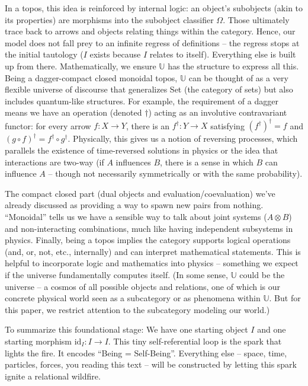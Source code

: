 \documentclass{article}
\begin{document}
In a topos, this idea is reinforced by internal logic: an object’s subobjects (akin to its properties) are morphisms into the subobject classifier $\Omega$. Those ultimately trace back to arrows and objects relating things within the category. Hence, our model does not fall prey to an infinite regress of definitions – the regress stops at the initial tautology ($I$ exists because $I$ relates to itself). Everything else is built up from there. Mathematically, we ensure $\mathbb{U}$ has the structure to express all this. Being a dagger-compact closed monoidal topos, $\mathbb{U}$ can be thought of as a very flexible universe of discourse that generalizes Set (the category of sets) but also includes quantum-like structures. For example, the requirement of a dagger means we have an operation (denoted $\dagger$) acting as an involutive contravariant functor: for every arrow $f: X \to Y$, there is an $f^\dagger: Y \to X$ satisfying $(f^\dagger)^\dagger = f$ and $(g\circ f)^\dagger = f^\dagger \circ g^\dagger$. Physically, this gives us a notion of reversing processes, which parallels the existence of time-reversed solutions in physics or the idea that interactions are two-way (if $A$ influences $B$, there is a sense in which $B$ can influence $A$ – though not necessarily symmetrically or with the same probability).

The compact closed part (dual objects and evaluation/coevaluation) we’ve already discussed as providing a way to spawn new pairs from nothing. “Monoidal” tells us we have a sensible way to talk about joint systems ($A \otimes B$) and non-interacting combinations, much like having independent subsystems in physics. Finally, being a topos implies the category supports logical operations (and, or, not, etc., internally) and can interpret mathematical statements. This is helpful to incorporate logic and mathematics into physics – something we expect if the universe fundamentally computes itself. (In some sense, $\mathbb{U}$ could be the universe – a cosmos of all possible objects and relations, one of which is our concrete physical world seen as a subcategory or as phenomena within $\mathbb{U}$. But for this paper, we restrict attention to the subcategory modeling our world.)

To summarize this foundational stage: We have one starting object $I$ and one starting morphism $\mathrm{id}_I: I \to I$. This tiny self-referential loop is the spark that lights the fire. It encodes “Being = Self-Being”. Everything else – space, time, particles, forces, you reading this text – will be constructed by letting this spark ignite a relational wildfire.
\end{document}
